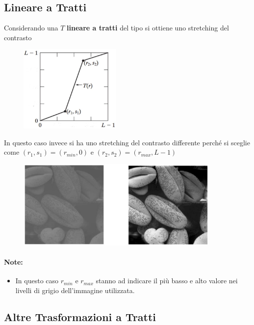 \subsection{Lineare a Tratti}

Considerando una $T$ \textbf{lineare a tratti} del tipo si ottiene uno
stretching del contrasto

\begin{figure}[H]
    \centering
    \includegraphics[width=5cm, keepaspectratio]{capitoli/immagini/imgs/lineare_a_tratti_esempio_6.jpg}
\end{figure}

In questo caso invece si ha uno stretching del contrasto differente perché si
sceglie come $(r_1, s_1) = (r_{min}, 0)$ e $(r_2, s_2) = (r_{max} , L - 1)$

\begin{figure}[H]
    \centering
    \includegraphics[width=10cm, keepaspectratio]{capitoli/immagini/imgs/globuli_rossi.jpg}
\end{figure}

\paragraph{Note:}
\begin{itemize}
    \item In questo caso $r_{min}$ e $r_{max}$ stanno ad indicare il più basso e
          alto valore nei livelli di grigio dell'immagine utilizzata.
\end{itemize}

\subsection{Altre Trasformazioni a Tratti}

